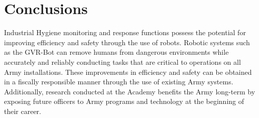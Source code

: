 \section{Conclusions}\label{conclusions}
Industrial Hygiene monitoring and response functions possess the potential for improving efficiency and safety through the use of robots. Robotic systems such as the GVR-Bot can remove humans from dangerous environments while accurately and reliably conducting tasks that are critical to operations on all Army installations. These improvements in efficiency and safety can be obtained in a fiscally responsible manner through the use of existing Army systems. Additionally, research conducted at the Academy benefits the Army long-term by exposing future officers to Army programs and technology at the beginning of their career.
